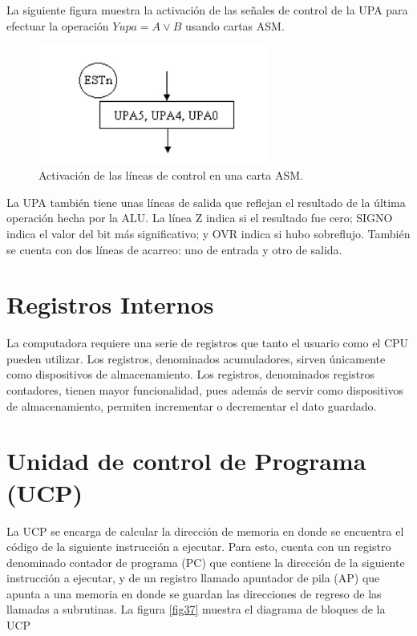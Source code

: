 \documentclass[12pt]{book}
\theoremstyle{definition}
\theoremstyle{remark}
\theoremstyle{plain}
\begin{document}
La siguiente figura muestra la activación de las señales de control de la UPA para efectuar la
operación $Yupa=A \vee B$ usando cartas ASM.

\begin{figure}
\centering
\includegraphics[width=3in]{tabla4.jpg}
\caption{Activación de las líneas de control en una carta ASM.}
\label{fig36}
\end{figure}

La UPA también tiene unas líneas de salida que reflejan el resultado de la última operación hecha
por la ALU. La línea Z indica si el resultado fue cero; SIGNO indica el valor del bit más
significativo; y OVR indica si hubo sobreflujo. También se cuenta con dos líneas de acarreo: uno de
entrada y otro de salida.

\section{Registros Internos}

La computadora requiere una serie de registros que tanto el
usuario como el CPU pueden utilizar. Los registros, denominados acumuladores, sirven
únicamente como dispositivos de almacenamiento. Los registros, denominados registros
contadores, tienen mayor funcionalidad, pues además de servir como dispositivos de
almacenamiento, permiten incrementar o decrementar el dato guardado.

\section{Unidad de control de Programa (UCP)}

La UCP se encarga de calcular la dirección de memoria en donde se encuentra el código de la
siguiente instrucción a ejecutar. Para esto, cuenta con un registro denominado contador de programa
(PC) que contiene la dirección de la siguiente instrucción a ejecutar, y de un registro llamado
apuntador de pila (AP) que apunta a una memoria en donde se guardan las direcciones de regreso de
las llamadas a subrutinas. La figura \ref{fig37} muestra el diagrama de bloques de la UCP
\end{document}
